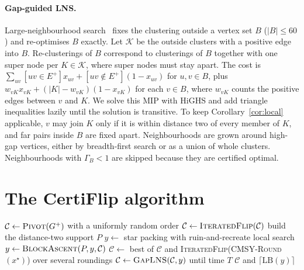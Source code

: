 \documentclass[11pt]{article}
\theoremstyle{definition}
\newcommand{\LB}{\mathrm{LB}}
\newcommand{\Ep}{E^{+}}
\begin{document}
\paragraph{Gap-guided LNS.}  Large-neighbourhood search~\citep{Shaw98} fixes
the clustering outside a vertex set $B$ ($|B|\le 60$) and re-optimises $B$
exactly.  Let $\mathcal K$ be the outside clusters with a positive edge into
$B$.  Re-clusterings of $B$ correspond to clusterings of $B$ together with one
super node per $K\in\mathcal K$, where super nodes must stay apart.  The cost is
$\sum_{uv}[uv\in\Ep]x_{uv}+[uv\notin\Ep](1-x_{uv})$ for $u,v\in B$, plus
$w_{vK}x_{vK}+(|K|-w_{vK})(1-x_{vK})$ for each $v\in B$, where $w_{vK}$ counts
the positive edges between $v$ and $K$.  We solve this MIP with HiGHS and add
triangle inequalities lazily until the solution is transitive.  To keep
Corollary~\ref{cor:local} applicable, $v$ may join $K$ only if it is within
distance two of every member of $K$, and far pairs inside $B$ are fixed apart.
Neighbourhoods are grown around high-gap vertices, either by breadth-first
search or as a union of whole clusters.  Neighbourhoods with $\Gamma_B<1$ are
skipped because they are certified optimal.

\section{The CertiFlip algorithm}\label{sec:algo}

\begin{algorithm}[t]
\caption{CertiFlip$(G^+,T)$}\label{alg:certiflip}
\begin{algorithmic}[1]
\State $\mathcal C\gets\textsc{Pivot}(G^+)$ with a uniformly random order
\State $\mathcal C\gets\textsc{IteratedFlip}(\mathcal C)$ 
\State build the distance-two support $P$
\State $y\gets$ star packing with ruin-and-recreate local search 
\State $y\gets\textsc{BlockAscent}(P,y,\mathcal C)$ 
  \State $\mathcal C\gets$ best of $\mathcal C$ and \textsc{IteratedFlip}(\textsc{CMSY-Round}$(x^\star)$) over several roundings
\EndIf
\State $\mathcal C\gets\textsc{GapLNS}(\mathcal C,y)$ until time $T$
\State \Return $\mathcal C$ and $\lceil\LB(y)\rceil$ 
\end{algorithmic}
\end{algorithm}
\end{document}
